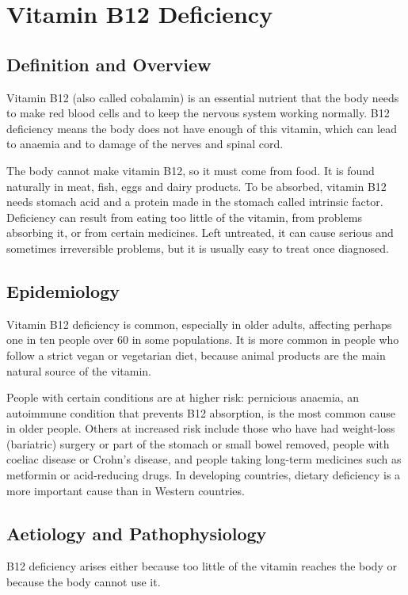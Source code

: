 \chapter{Vitamin B12 Deficiency}

\section*{Definition and Overview}
Vitamin B12 (also called cobalamin) is an essential nutrient that the body needs to make red blood cells and to keep the nervous system working normally. B12 deficiency means the body does not have enough of this vitamin, which can lead to anaemia and to damage of the nerves and spinal cord.

The body cannot make vitamin B12, so it must come from food. It is found naturally in meat, fish, eggs and dairy products. To be absorbed, vitamin B12 needs stomach acid and a protein made in the stomach called intrinsic factor. Deficiency can result from eating too little of the vitamin, from problems absorbing it, or from certain medicines. Left untreated, it can cause serious and sometimes irreversible problems, but it is usually easy to treat once diagnosed.

\section*{Epidemiology}
Vitamin B12 deficiency is common, especially in older adults, affecting perhaps one in ten people over 60 in some populations. It is more common in people who follow a strict vegan or vegetarian diet, because animal products are the main natural source of the vitamin.

People with certain conditions are at higher risk: pernicious anaemia, an autoimmune condition that prevents B12 absorption, is the most common cause in older people. Others at increased risk include those who have had weight-loss (bariatric) surgery or part of the stomach or small bowel removed, people with coeliac disease or Crohn's disease, and people taking long-term medicines such as metformin or acid-reducing drugs. In developing countries, dietary deficiency is a more important cause than in Western countries.

\section*{Aetiology and Pathophysiology}
B12 deficiency arises either because too little of the vitamin reaches the body or because the body cannot use it.

